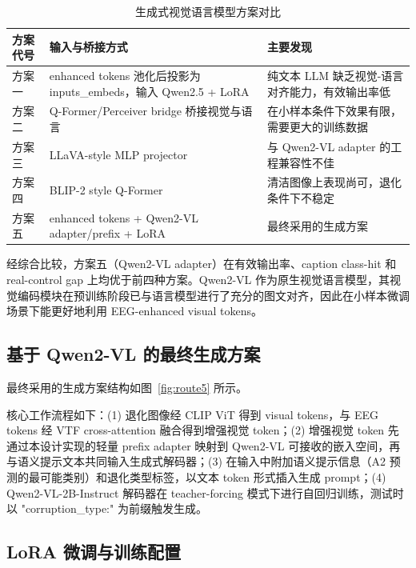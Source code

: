 \begin{table}[htbp]
  \centering
  \caption{生成式视觉语言模型方案对比}
  \label{tab:route-comparison}
  \begin{tabularx}{\linewidth}{l l X}
    \toprule
    方案代号 & 输入与桥接方式 & 主要发现 \\
    \midrule
    方案一 & enhanced tokens 池化后投影为 inputs\_embeds，输入 Qwen2.5 + LoRA & 纯文本 LLM 缺乏视觉-语言对齐能力，有效输出率低 \\
    方案二 & Q-Former/Perceiver bridge 桥接视觉与语言 & 在小样本条件下效果有限，需要更大的训练数据 \\
    方案三 & LLaVA-style MLP projector & 与 Qwen2-VL adapter 的工程兼容性不佳 \\
    方案四 & BLIP-2 style Q-Former & 清洁图像上表现尚可，退化条件下不稳定 \\
    方案五 & enhanced tokens + Qwen2-VL adapter/prefix + LoRA & 最终采用的生成方案 \\
    \bottomrule
  \end{tabularx}
\end{table}

经综合比较，方案五（Qwen2-VL adapter）在有效输出率、caption class-hit 和 real-control gap 上均优于前四种方案。Qwen2-VL 作为原生视觉语言模型，其视觉编码模块在预训练阶段已与语言模型进行了充分的图文对齐，因此在小样本微调场景下能更好地利用 EEG-enhanced visual tokens。

\subsection{基于 Qwen2-VL 的最终生成方案}

最终采用的生成方案结构如图~\ref{fig:route5} 所示。


核心工作流程如下：(1) 退化图像经 CLIP ViT 得到 visual tokens，与 EEG tokens 经 VTF cross-attention 融合得到增强视觉 token；(2) 增强视觉 token 先通过本设计实现的轻量 prefix adapter 映射到 Qwen2-VL 可接收的嵌入空间，再与语义提示文本共同输入生成式解码器；(3) 在输入中附加语义提示信息（A2 预测的最可能类别）和退化类型标签，以文本 token 形式插入生成 prompt；(4) Qwen2-VL-2B-Instruct 解码器在 teacher-forcing 模式下进行自回归训练，测试时以 "corruption\_type:" 为前缀触发生成。

\subsection{LoRA 微调与训练配置}

